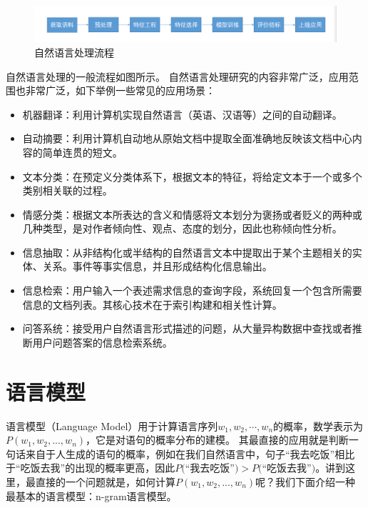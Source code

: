 \documentclass[graybox,envcountchap,sectrefs]{svmono}
\begin{document}
\begin{figure}[htb]
	\begin{center}
		\includegraphics[width=1.0\textwidth]{img/chapter_nlp/NLP_Pipeline.png}
		\caption{自然语言处理流程}
		\label{pic:lda}
	\end{center}
\end{figure}


自然语言处理的一般流程如图所示。
自然语言处理研究的内容非常广泛，应用范围也非常广泛，如下举例一些常见的应用场景：
\begin{itemize}
\item 机器翻译：利用计算机实现自然语言（英语、汉语等）之间的自动翻译。
\item 自动摘要：利用计算机自动地从原始文档中提取全面准确地反映该文档中心内容的简单连贯的短文。
\item 文本分类：在预定义分类体系下，根据文本的特征，将给定文本于一个或多个类别相关联的过程。
\item 情感分类：根据文本所表达的含义和情感将文本划分为褒扬或者贬义的两种或几种类型，是对作者倾向性、观点、态度的划分，因此也称倾向性分析。
\item 信息抽取：从非结构化或半结构的自然语言文本中提取出于某个主题相关的实体、关系。事件等事实信息，并且形成结构化信息输出。
\item 信息检索：用户输入一个表述需求信息的查询字段，系统回复一个包含所需要信息的文档列表。其核心技术在于索引构建和相关性计算。
\item 问答系统：接受用户自然语言形式描述的问题，从大量异构数据中查找或者推断用户问题答案的信息检索系统。
\end{itemize}


\section{语言模型}

语言模型（Language Model）用于计算语言序列$w_1, w_2, \cdots, w_n$的概率，数学表示为$P(w_1, w_2, ..., w_n)$，它是对语句的概率分布的建模。
其最直接的应用就是判断一句话来自于人生成的语句的概率，例如在我们自然语言中，句子``我去吃饭''相比于``吃饭去我''的出现的概率更高，因此$P($``我去吃饭''$) > P($``吃饭去我''$)$。讲到这里，最直接的一个问题就是，如何计算$P(w_1, w_2, ..., w_n)$呢？我们下面介绍一种最基本的语言模型：n-gram语言模型。
\end{document}

